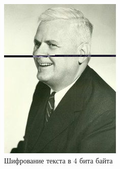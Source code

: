 \documentclass[10pt,a4paper,final]{article} %
\begin{document}
\begin{figure}[h!]
\begin{minipage}{0.3\textwidth}
		\includegraphics[width=\linewidth]{img/Haskell_4 (1)}
		\caption{Шифрование текста в 4 бита байта}
	\end{minipage}
	\hspace{0.02\textwidth}
	\begin{minipage}{0.3\textwidth}
		\centering

\end{minipage}
\end{figure}
\end{document}
